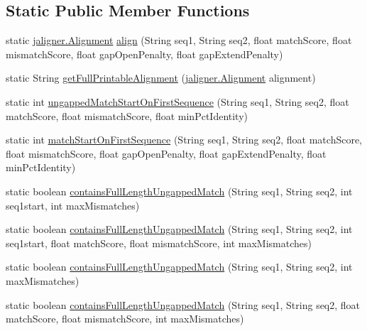 \subsection*{Static Public Member Functions}
\begin{DoxyCompactItemize}
\item 
static \hyperlink{classjaligner_1_1_alignment}{jaligner.\+Alignment} \hyperlink{classumms_1_1core_1_1alignment_1_1_smith_waterman_alignment_a7bc9206be3a25d600e0221b004c156ba}{align} (String seq1, String seq2, float match\+Score, float mismatch\+Score, float gap\+Open\+Penalty, float gap\+Extend\+Penalty)
\item 
static String \hyperlink{classumms_1_1core_1_1alignment_1_1_smith_waterman_alignment_ac0693d7813e33cc22a40fdeb4295a081}{get\+Full\+Printable\+Alignment} (\hyperlink{classjaligner_1_1_alignment}{jaligner.\+Alignment} alignment)
\item 
static int \hyperlink{classumms_1_1core_1_1alignment_1_1_smith_waterman_alignment_acd040e57ba29f4ef0abc1ac103845c3d}{ungapped\+Match\+Start\+On\+First\+Sequence} (String seq1, String seq2, float match\+Score, float mismatch\+Score, float min\+Pct\+Identity)
\item 
static int \hyperlink{classumms_1_1core_1_1alignment_1_1_smith_waterman_alignment_aefe75b54dc89476479283e1f8060062f}{match\+Start\+On\+First\+Sequence} (String seq1, String seq2, float match\+Score, float mismatch\+Score, float gap\+Open\+Penalty, float gap\+Extend\+Penalty, float min\+Pct\+Identity)
\item 
static boolean \hyperlink{classumms_1_1core_1_1alignment_1_1_smith_waterman_alignment_a0a0fb30db091b27fd560c0e04b0f7d67}{contains\+Full\+Length\+Ungapped\+Match} (String seq1, String seq2, int seq1start, int max\+Mismatches)
\item 
static boolean \hyperlink{classumms_1_1core_1_1alignment_1_1_smith_waterman_alignment_a276f466de9bd14543c155c41a5ee8f6e}{contains\+Full\+Length\+Ungapped\+Match} (String seq1, String seq2, int seq1start, float match\+Score, float mismatch\+Score, int max\+Mismatches)
\item 
static boolean \hyperlink{classumms_1_1core_1_1alignment_1_1_smith_waterman_alignment_a5aa830d0dfe5ae34c96f6f4559ac4d83}{contains\+Full\+Length\+Ungapped\+Match} (String seq1, String seq2, int max\+Mismatches)
\item 
static boolean \hyperlink{classumms_1_1core_1_1alignment_1_1_smith_waterman_alignment_a32ced5efd4ee94d9b076d217153e43c2}{contains\+Full\+Length\+Ungapped\+Match} (String seq1, String seq2, float match\+Score, float mismatch\+Score, int max\+Mismatches)
\end{DoxyCompactItemize}
